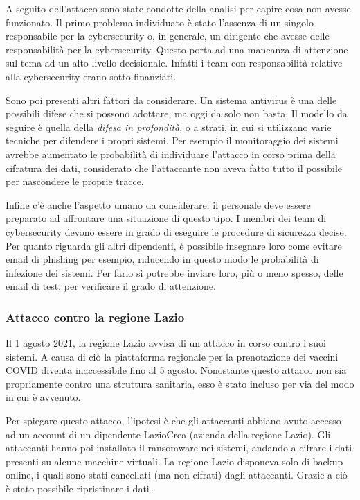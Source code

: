 \documentclass[12pt]{article}
\begin{document}
A seguito dell'attacco sono state condotte della analisi per capire cosa non avesse funzionato. Il primo problema individuato è stato l'assenza di un singolo responsabile per la cybersecurity o, in generale, un dirigente che avesse delle responsabilità per la cybersecurity. Questo porta ad una mancanza di attenzione sul tema ad un alto livello decisionale. Infatti i team con responsabilità relative alla cybersecurity erano sotto-finanziati.

Sono poi presenti altri fattori da considerare. Un sistema antivirus è una delle possibili difese che si possono adottare, ma oggi da solo non basta. Il modello da seguire è quella della \textit{difesa in profondità}, o a strati, in cui si utilizzano varie tecniche per difendere i propri sistemi. Per esempio il monitoraggio dei sistemi avrebbe aumentato le probabilità di individuare l'attacco in corso prima della cifratura dei dati, considerato che l'attaccante non aveva fatto tutto il possibile per nascondere le proprie tracce.

Infine c'è anche l'aspetto umano da considerare: il personale deve essere preparato ad affrontare una situazione di questo tipo. I membri dei team di cybersecurity devono essere in grado di eseguire le procedure di sicurezza decise. Per quanto riguarda gli altri dipendenti, è possibile insegnare loro come evitare email di phishing per esempio, riducendo in questo modo le probabilità di infezione dei sistemi. Per farlo si potrebbe inviare loro, più o meno spesso, delle email di test, per verificare il grado di attenzione.

\subsubsection{Attacco contro la regione Lazio}

Il 1 agosto 2021, la regione Lazio avvisa di un attacco in corso contro i suoi sistemi. A causa di ciò la piattaforma regionale per la prenotazione dei vaccini COVID diventa inaccessibile fino al 5 agosto. Nonostante questo attacco non sia propriamente contro una struttura sanitaria, esso è stato incluso per via del modo in cui è avvenuto.

Per spiegare questo attacco, l'ipotesi è che gli attaccanti abbiano avuto accesso ad un account di un dipendente LazioCrea (azienda della regione Lazio). Gli attaccanti hanno poi installato il ransomware nei sistemi, andando a cifrare i dati presenti su alcune macchine virtuali. La regione Lazio disponeva solo di backup online, i quali sono stati cancellati (ma non cifrati) dagli attaccanti. Grazie a ciò è stato possibile ripristinare i dati \cite{noauthor_regione_2021} \cite{noauthor_ransomware_2022-5}.
\end{document}

